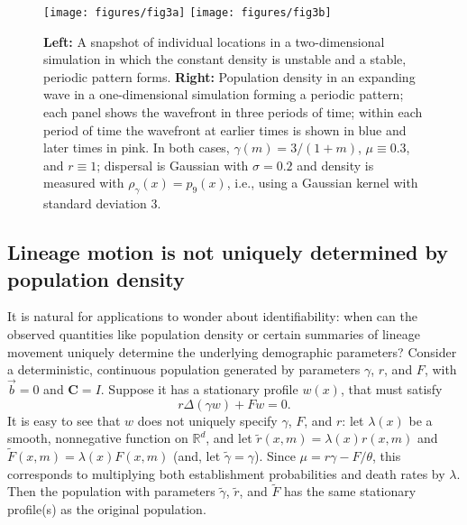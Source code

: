 \documentclass[EJP]{ejpecp} %
\newcommand{\IR}{\mathbb R}
\newcommand{\meanq}{\vec b}    %
\newcommand{\covq}{\mathbf{C}}     %
\begin{document}
\begin{figure}
    \begin{center}
        \texttt{[image: figures/fig3a]}
        \texttt{[image: figures/fig3b]}
    \end{center}
    \caption{
        \textbf{Left:} A snapshot of individual locations in a two-dimensional simulation
        in which the constant density is unstable
        and a stable, periodic pattern forms.
        \textbf{Right:} Population density in an expanding wave in a one-dimensional simulation
        forming a periodic pattern;
        each panel shows the wavefront in three periods of time;
        within each period of time the wavefront at earlier times is shown in blue
        and later times in pink.
        In both cases, $\gamma(m) = 3/(1 + m)$, $\mu \equiv 0.3$, and $r \equiv 1$;
        dispersal is Gaussian with $\sigma=0.2$ and density is measured with $\rho_\gamma(x) = p_9(x)$,
        i.e., using a Gaussian kernel with standard deviation 3.
        \label{fig:clumping}
    }
\end{figure}


\subsection{Lineage motion is not uniquely determined by population density}
\label{sec:nonunique_lineage}

It is natural for applications to wonder about identifiability:
when can the observed quantities like population density
or certain summaries of lineage movement uniquely determine
the underlying demographic parameters?
Consider a deterministic,
continuous population generated by parameters $\gamma$, $r$, and $F$,
with $\meanq = 0$ and $\covq = I$.
Suppose it has a stationary profile $w(x)$, that must satisfy
$$
   r \Delta(\gamma w) + F w = 0 .
$$
It is easy to see that $w$ does not uniquely specify $\gamma$, $F$, and $r$:
let $\lambda(x)$ be a smooth, nonnegative function on $\IR^d$,
and let $\widetilde{r}(x, m) = \lambda(x) r(x, m)$ and $\widetilde{F}(x, m) = \lambda(x) F(x, m)$
(and, let $\widetilde{\gamma} = \gamma$).
Since $\mu = r \gamma - F/\theta$,
this corresponds to multiplying both establishment probabilities and death rates by $\lambda$.
Then the population with parameters $\widetilde{\gamma}$, $\widetilde{r}$, and $\widetilde{F}$
has the same stationary profile(s) as the original population.
\end{document}
